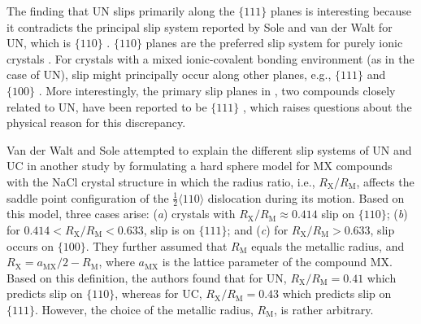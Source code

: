 \documentclass[applsci,article,submit,pdftex,moreauthors]{Definitions/mdpi}
\newcommand{\?}{\stackrel{?}{=}}
\providecommand{\DIFadd}[1]{{\bf #1}} %
\providecommand{\DIFdel}[1]{} %
\providecommand{\DIFaddbegin}{\protect\color{blue}} %
\providecommand{\DIFaddend}{\protect\color{black}} %
\providecommand{\DIFdelbegin}{\protect\color{red}} %
\providecommand{\DIFdelend}{\protect\color{black}} %
\newcommand{\DIFscaledelfig}{0.5}
\newlength{\DIFdelgraphicswidth} %
\newlength{\DIFdelgraphicsheight} %
\newcommand{\DIFaddincludegraphics}[2][]{{\color{blue}\fbox{\DIFOincludegraphics[#1]{#2}}}} %
\newcommand{\DIFdelincludegraphics}[2][]{%
\sbox{\DIFdelgraphicsbox}{\DIFOincludegraphics[#1]{#2}}%
\settoboxwidth{\DIFdelgraphicswidth}{\DIFdelgraphicsbox} %
\settoboxtotalheight{\DIFdelgraphicsheight}{\DIFdelgraphicsbox} %
\scalebox{\DIFscaledelfig}{%
\parbox[b]{\DIFdelgraphicswidth}{\usebox{\DIFdelgraphicsbox}\\[-\baselineskip] \rule{\DIFdelgraphicswidth}{0em}}\llap{\resizebox{\DIFdelgraphicswidth}{\DIFdelgraphicsheight}{%
\setlength{\unitlength}{\DIFdelgraphicswidth}%
\begin{picture}(1,1)%
\thicklines\linethickness{2pt} %
{\color[rgb]{1,0,0}\put(0,0){\framebox(1,1){}}}%
{\color[rgb]{1,0,0}\put(0,0){\line( 1,1){1}}}%
{\color[rgb]{1,0,0}\put(0,1){\line(1,-1){1}}}%
\end{picture}%
}\hspace*{3pt}}} %
} %
\DeclareRobustCommand{\DIFaddbegin}{\DIFOaddbegin \let\includegraphics\DIFaddincludegraphics} %
\DeclareRobustCommand{\DIFaddend}{\DIFOaddend \let\includegraphics\DIFOincludegraphics} %
\DeclareRobustCommand{\DIFdelbegin}{\DIFOdelbegin \let\includegraphics\DIFdelincludegraphics} %
\DeclareRobustCommand{\DIFdelend}{\DIFOaddend \let\includegraphics\DIFOincludegraphics} %
\begin{document}
The finding that UN slips primarily along the $\{111\}$ planes is interesting because it contradicts the principal slip system reported by Sole and van der Walt for UN, which is $\{110\}$ \cite{Sole1968}. $\{110\}$ planes are the preferred slip system for purely ionic crystals \cite{VanDerWalt1967, Hull2011}. For crystals with a mixed ionic-covalent bonding environment (as in the case of UN), slip might principally occur along other planes, e.g., $\{111\}$ and $\{100\}$ \cite{VanDerWalt1967, Yadav2014}. More interestingly, the primary slip planes in \DIFdelbegin \DIFdel{UC and TiC}\DIFdelend \DIFaddbegin \DIFadd{uranium monocarbide (UC) and titanium carbide}\DIFaddend , two compounds closely related to UN, have been reported to be $\{111\}$ \cite{Sole1968, Vasudevamurthy2022}, which raises questions about the physical reason for this discrepancy.

Van der Walt and Sole attempted to explain the different slip systems of UN and UC in another study \cite{VanDerWalt1967} by formulating a hard sphere model for MX compounds with the NaCl crystal structure in which the radius ratio, i.e., $R_\text{X}/R_\text{M}$, affects the saddle point configuration of the $\frac{1}{2}\langle110\rangle$ dislocation during its motion. Based on this model, three cases arise: (\textit{a}) crystals with $R_\text{X}/R_\text{M} \approx 0.414$ slip on $\{110\}$; (\textit{b}) for $0.414 < R_\text{X}/R_\text{M} < 0.633$, slip is on $\{111\}$; and (\textit{c}) for $R_\text{X}/R_\text{M} > 0.633$, slip occurs on $\{100\}$. They further assumed that $R_\text{M}$ equals the metallic radius, and $R_\text{X} = a_\text{MX}/2 - R_\text{M}$, where $a_\text{MX}$ is the lattice parameter of the compound MX. Based on this definition, the authors found that for UN, $R_\text{X}/R_\text{M} = 0.41$ which predicts slip on $\{110\}$, whereas for UC, $R_\text{X}/R_\text{M} = 0.43$ which predicts slip on $\{111\}$. However, the choice of the metallic radius, $R_\text{M}$, is rather arbitrary.
\end{document}

